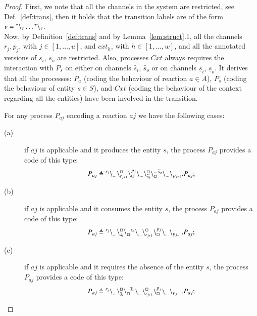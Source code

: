  \begin{proof}
 First, we note that all the channels in the system are restricted, see Def.~\ref{def:trans}, then
 it holds that the transition labels are of the form  $v={}^{\tau} \backslash_{\tau}\dots{}^{\tau} \backslash_{\tau}$.\\
 Now,
by Definition~\ref{def:trans} and by Lemma~\ref{lem:struct}.1, all the  channels $r_j,p_j$, with
 $j \in [1,\dots,u]$, and $cxt_h$, with $h \in [1, \dots, w]$, and all the annotated versions of 
 $s_i$, $s_o$ are restricted. Also, processes $\mathit{Cxt}$ always requires the 
 interaction with $P_s$ on either on channels $\widehat{s}_i$, $\widehat{s}_o$ or on channels 
 $\underline{s}_i$, $\underline{s}_o$.
 It derives that all the processes: $P_a$  (coding the behaviour of reaction $a \in A$), $P_s$ (coding the behaviour of entity $s \in S$), and $\mathit{Cxt}$ (coding the behaviour of the context regarding all the entities) have been involved in the transition. 

For any process $P_{aj}$ encoding a reaction $aj$ we have the following cases:
\begin{description}
\item[(a)] 
if $aj$ is applicable and it produces the entity $s$,  
the process $P_{aj}$ provides a code of this type:
$$P_{aj}\triangleq {}^{r_j} \backslash_{\dots}\backslash_{r_{j+1}}^{\scriptstyle {\square}}\backslash_{\scriptstyle {\square}}^{p_j}{}^{} \backslash_{\dots}\backslash_{\widetilde{s}_i}^{\scriptstyle {\square}}\backslash_{\scriptstyle {\square}}^{\dots}{}^{\widetilde{s}_o} \backslash_{\dots} \backslash_{p_{j+1}}.P_{aj} ;$$

\item[(b)] 
 if $aj$ is applicable and it  consumes the entity $s$,
 the process $P_{aj}$ provides a code of this type: 
$$P_{aj}\triangleq {}^{r_j} \backslash_{\dots}\backslash_{s_i}^{\scriptstyle {\square}}\backslash_{\scriptstyle {\square}}^{}{}^{s_o} \backslash_{\dots} \backslash_{r_{j+1}}^{\scriptstyle {\square}}\backslash_{\scriptstyle {\square}}^{p_j}{}^{} \backslash_{\dots}{}^{} \backslash_{p_{j+1}}.P_{aj} ;$$

\item[(c)]  
 if $aj$ is applicable and it requires the absence of the entity $s$,
 the process $P_{aj}$  provides a code of this type: 
$$P_{aj}\triangleq {}^{r_j} \backslash_{\dots}\backslash_{\overline{s}_i}^{\scriptstyle {\square}}\backslash_{\scriptstyle {\square}}^{}{}^{\overline{s}_o} \backslash_{\dots} \backslash_{r_{j+1}}^{\scriptstyle {\square}}\backslash_{\scriptstyle {\square}}^{p_j}{}^{} \backslash_{\dots}{}^{} \backslash_{p_{j+1}}.P_{aj} ;$$


\end{description}
\end{proof}
